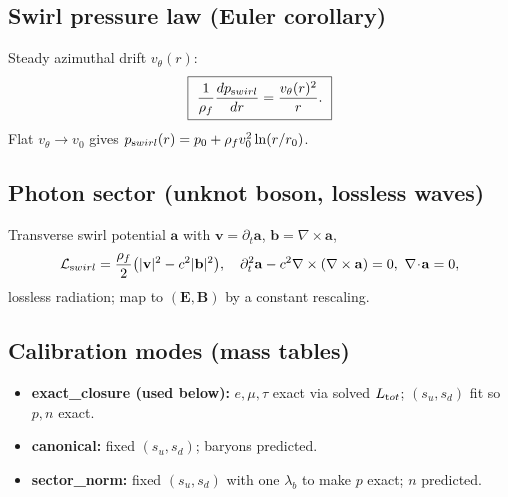\documentclass[11pt]{article}
\begin{document}
    \subsection*{Swirl pressure law (Euler corollary)}
        Steady azimuthal drift $v_\theta(r)$:
        \[
            \boxed{~
            \frac{1}{\rho_f}\frac{dp_{\textrm swirl}}{dr}=\frac{v_\theta(r)^2}{r}.
            ~}
        \]
        Flat $v_\theta\to v_0$ gives $p_{\textrm swirl}(r)=p_0+\rho_f v_0^2\ln(r/r_0)$.

    \subsection*{Photon sector (unknot boson, lossless waves)}
        Transverse swirl potential $\mathbf a$ with $\mathbf v=\partial_t\mathbf a$, $\mathbf b=\nabla\times\mathbf a$,
        \[
            \mathcal L_{\textrm swirl}=\frac{\rho_f}{2}\big(|\mathbf v|^2-c^2|\mathbf b|^2\big),\quad
            \partial_t^2\mathbf a-c^2\nabla\times(\nabla\times\mathbf a)=0,\ \nabla\!\cdot\!\mathbf a=0,
        \]
        lossless radiation; map to $(\mathbf E,\mathbf B)$ by a constant rescaling.

    \subsection*{Calibration modes (mass tables)}
        \begin{itemize}
        \item \textbf{exact\_closure (used below):} $e,\mu,\tau$ exact via solved $L_{\textrm tot}$; $(s_u,s_d)$ fit so $p,n$ exact.
        \item \textbf{canonical:} fixed $(s_u,s_d)$; baryons predicted.
        \item \textbf{sector\_norm:} fixed $(s_u,s_d)$ with one $\lambda_b$ to make $p$ exact; $n$ predicted.
        \end{itemize}
\end{document}
